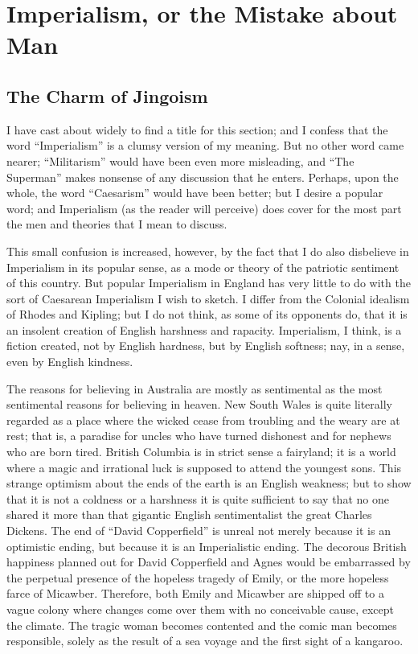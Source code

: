 \documentclass{book}
\begin{document}
\setcounter{chapter}{0}\part{Imperialism, or the Mistake about Man}
\label{chapter-13}
\chapter{The Charm of Jingoism}
\label{chapter-14}
I have cast about widely to find a title for this section; and I confess that the word “Imperialism” is a clumsy version of my meaning. But no other word came nearer; “Militarism” would have been even more misleading, and “The Superman” makes nonsense of any discussion that he enters. Perhaps, upon the whole, the word “Caesarism” would have been better; but I desire a popular word; and Imperialism (as the reader will perceive) does cover for the most part the men and theories that I mean to discuss.

This small confusion is increased, however, by the fact that I do also disbelieve in Imperialism in its popular sense, as a mode or theory of the patriotic sentiment of this country. But popular Imperialism in England has very little to do with the sort of Caesarean Imperialism I wish to sketch. I differ from the Colonial idealism of Rhodes and Kipling; but I do not think, as some of its opponents do, that it is an insolent creation of English harshness and rapacity. Imperialism, I think, is a fiction created, not by English hardness, but by English softness; nay, in a sense, even by English kindness.

The reasons for believing in Australia are mostly as sentimental as the most sentimental reasons for believing in heaven. New South Wales is quite literally regarded as a place where the wicked cease from troubling and the weary are at rest; that is, a paradise for uncles who have turned dishonest and for nephews who are born tired. British Columbia is in strict sense a fairyland; it is a world where a magic and irrational luck is supposed to attend the youngest sons. This strange optimism about the ends of the earth is an English weakness; but to show that it is not a coldness or a harshness it is quite sufficient to say that no one shared it more than that gigantic English sentimentalist the great Charles Dickens. The end of “David Copperfield” is unreal not merely because it is an optimistic ending, but because it is an Imperialistic ending. The decorous British happiness planned out for David Copperfield and Agnes would be embarrassed by the perpetual presence of the hopeless tragedy of Emily, or the more hopeless farce of Micawber. Therefore, both Emily and Micawber are shipped off to a vague colony where changes come over them with no conceivable cause, except the climate. The tragic woman becomes contented and the comic man becomes responsible, solely as the result of a sea voyage and the first sight of a kangaroo.
\end{document}
